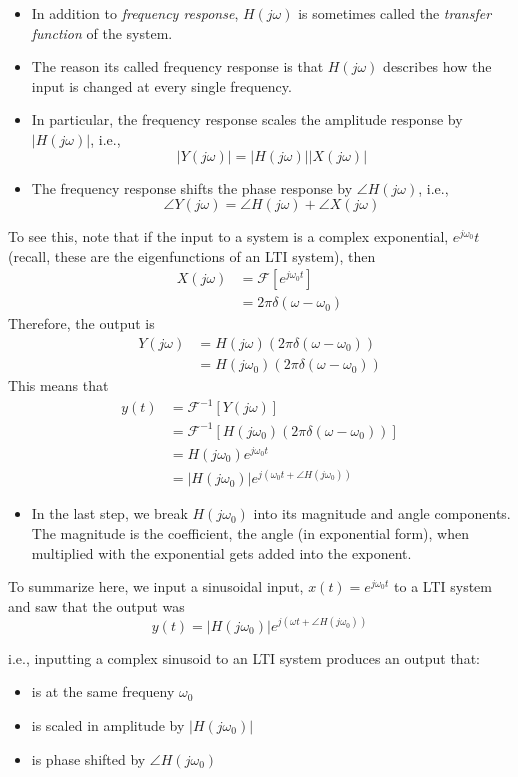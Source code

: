\documentclass[10pt]{article}
\newcommand{\fourier}{\mathcal{F}}
\begin{document}
\begin{itemize}
    \item In addition to \textit{frequency response}, $H(j\omega)$ is sometimes called the \textit{transfer function} of the system.
    \item The reason its called frequency response is that $H(j\omega)$ describes how the input is changed at every single frequency.
    \item In particular, the frequency response scales the amplitude response by $|H(j\omega)|$, i.e.,
    \[|Y(j\omega)| = |H(j\omega)||X(j\omega)|\]
    \item The frequency response shifts the phase response by $\angle H(j\omega)$, i.e.,
    \[\angle Y(j\omega) = \angle H(j\omega) + \angle X(j\omega)\]
\end{itemize}
To see this, note that if the input to a system is a complex exponential, $e^{j\omega_0}t$ (recall, these are the eigenfunctions of an LTI system), then
\begin{align*}
    X(j\omega) &= \fourier\left[e^{j\omega_0 t}\right]\\
    &= 2\pi \delta(\omega - \omega_0)
\end{align*}
Therefore, the output is
\begin{align*}
    Y(j\omega) &= H(j\omega)(2\pi \delta(\omega - \omega_0))\\
    &= H(j\omega_0)(2\pi \delta(\omega - \omega_0))
\end{align*}
This means that
\begin{align*}
    y(t) &= \fourier^{-1}[Y(j\omega)]\\
    &= \fourier^{-1}[H(j\omega_0)(2\pi \delta(\omega - \omega_0))]\\
    &= H(j\omega_0) e^{j\omega_0 t}\\
    &= |H(j\omega_0)| e^{j(\omega_0 t + \angle H(j\omega_0))}
\end{align*}
\begin{itemize}
    \item In the last step, we break $H(j\omega_0)$ into its magnitude and angle components.  The magnitude is the coefficient, the angle (in exponential form), when multiplied with the exponential gets added into the exponent.
\end{itemize}
To summarize here, we input a sinusoidal input, $x(t) = e^{j\omega_0 t}$ to a LTI system and saw that the output was
\[y(t) = |H(j\omega_0)| e^{j(\omega t + \angle H(j\omega_0))}\]

i.e., inputting a complex sinusoid to an LTI system produces an output that:
\begin{itemize}
    \item is at the same frequeny $\omega_0$
    \item is scaled in amplitude by $|H(j\omega_0)|$
    \item is phase shifted by $\angle H(j\omega_0)$
\end{itemize}
\end{document}
